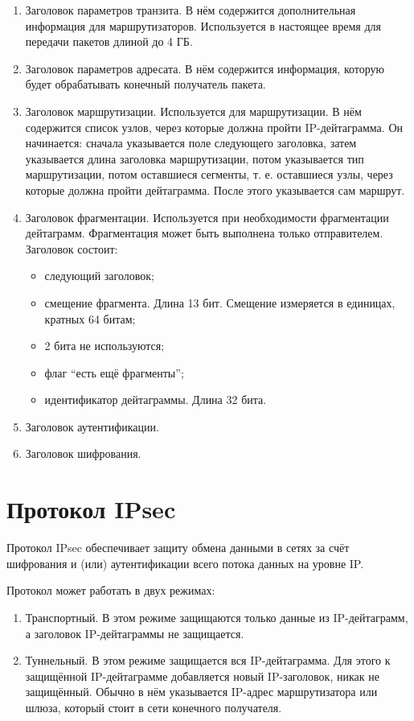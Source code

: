 \documentclass[12pt, russian, oneside, article]{ncc}
\begin{document}
\begin{enumerate}
\item Заголовок параметров транзита. В нём содержится дополнительная информация для маршрутизаторов. Используется в настоящее время для передачи пакетов длиной до 4 ГБ.
\item Заголовок параметров адресата. В нём содержится информация, которую будет обрабатывать конечный получатель пакета.
\item Заголовок маршрутизации. Используется для маршрутизации. В нём содержится список узлов, через которые должна пройти IP-дейтаграмма. Он начинается: сначала указывается поле следующего заголовка, затем указывается длина заголовка маршрутизации, потом указывается тип маршрутизации, потом оставшиеся сегменты, т. е. оставшиеся узлы, через которые должна пройти дейтаграмма. После этого указывается сам маршрут.
\item Заголовок фрагментации. Используется при необходимости фрагментации дейтаграмм. Фрагментация может быть выполнена только отправителем. Заголовок состоит:

\begin{itemize}
\item следующий заголовок;
\item смещение фрагмента. Длина 13 бит. Смещение измеряется в единицах, кратных 64 битам;
\item 2 бита не используются;
\item флаг ``есть ещё фрагменты'';
\item идентификатор дейтаграммы. Длина 32 бита.
\end{itemize}

\item Заголовок аутентификации.
\item Заголовок шифрования.
\end{enumerate}
\section{Протокол IPsec}
\label{sec-4}


Протокол IPsec обеспечивает защиту обмена данными в сетях за счёт шифрования и (или) аутентификации всего потока данных на уровне IP.

Протокол может работать в двух режимах:
\begin{enumerate}
\item Транспортный. В этом режиме защищаются только данные из IP-дейтаграмм, а заголовок IP-дейтаграммы не защищается.
\item Туннельный. В этом режиме защищается вся IP-дейтаграмма. Для этого к защищённой IP-дейтаграмме добавляется новый IP-заголовок, никак не защищённый. Обычно в нём указывается IP-адрес маршрутизатора или шлюза, который стоит в сети конечного получателя.
\end{enumerate}
\end{document}
